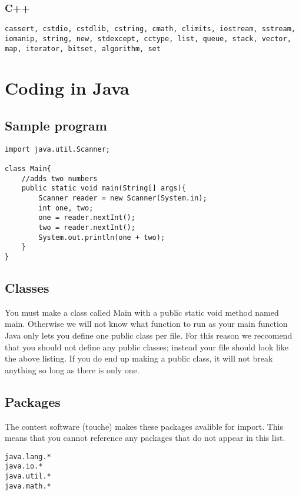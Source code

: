 \documentclass{article}
\begin{document}
	\subsubsection{C++}
	\begin{lstlisting}
cassert, cstdio, cstdlib, cstring, cmath, climits, iostream, sstream, iomanip, string, new, stdexcept, cctype, list, queue, stack, vector, map, iterator, bitset, algorithm, set
	\end{lstlisting}
	
	\section{Coding in Java}
	\subsection{Sample program}
	\lstset{language=java}
	\begin{lstlisting}
import java.util.Scanner;

class Main{ 
	//adds two numbers
	public static void main(String[] args){
		Scanner reader = new Scanner(System.in); 
		int one, two;
		one = reader.nextInt();
		two = reader.nextInt();
		System.out.println(one + two);
	}
}
	\end{lstlisting}
	
	\subsection{Classes}
	You must make a class called Main with a public static void method named main.
	Otherwise we will not know what function to run as your main function \\
	
	Java only lets you define one public class per file. 
	For this reason we reccomend that you should not define any public classes; instead your file should look like the above listing.
	If you do end up making a public class, it will not break anything so long as there is only one.

	\subsection{Packages}
	The contest software (touche) makes these packages avalible for import. 
	This means that you cannot reference any packages that do not appear in this list.

	\begin{lstlisting}
java.lang.*
java.io.*
java.util.*
java.math.*
	\end{lstlisting}
	
\end{document}
